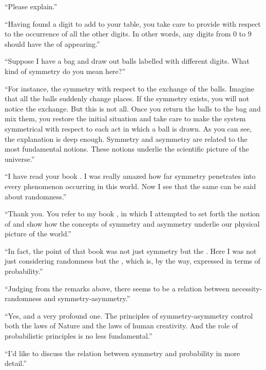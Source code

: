 \begin{dialogue}
\rdr ``Please explain.''

\athr ``Having found a digit to add to your table, you take care to
provide  with respect to the occurrence of all the other digits.
In other words, any digits from 0 to 9 should have the  of
appearing.''

\rdr ``Suppose I have a bag and draw out balls labelled
with different digits. What kind of symmetry do you mean
here?''


\athr ``For instance, the symmetry with respect to the exchange of
the balls. Imagine that all the balls suddenly change places. If the
symmetry exists, you will not notice the exchange. But this is not all.
Once you return the balls to the bag and mix them, you restore the
initial situation and take care to make the system symmetrical with
respect to each act in which a ball is drawn. As you can see, the
explanation is deep enough. Symmetry and asymmetry are related to
the most fundamental notions. These notions underlie the scientific
picture of the universe.''


\rdr ``I have read your book .
I was really amazed how far symmetry penetrates into every
phenomenon occurring in this world. Now I see that the same can be
said about randomness.''

\athr ``Thank you. You refer to my book , in which I attempted to set forth the notion of
 and show how the concepts of symmetry and asymmetry
underlie our physical picture of the world.''

``In fact, the point of that book was not just symmetry but the
. Here I was not just
considering randomness but the , which is, by the way, expressed in terms of probability.''

\rdr ``Judging from the remarks above, there seems to be
a relation between necessity-randomness and symmetry-asymmetry.''

\athr ``Yes, and a very profound one. The principles of
symmetry-asymmetry control both the laws of Nature and the laws of
human creativity. And the role of probabilistic principles is no less
fundamental.''

\rdr ``I'd like to discuss the relation between symmetry and
probability in more detail.''


\end{dialogue}
